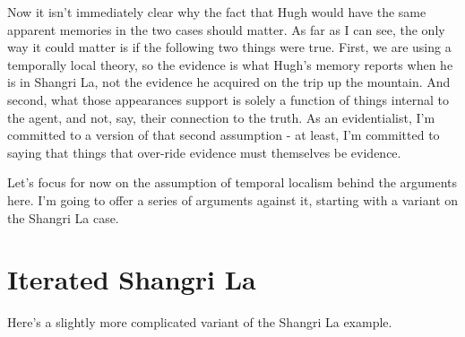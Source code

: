 \documentclass[
  11pt,
  letterpaper,
  DIV=11,
  numbers=noendperiod,
  twoside]{scrartcl}
\begin{document}
Now it isn't immediately clear why the fact that Hugh would have the
same apparent memories in the two cases should matter. As far as I can
see, the only way it could matter is if the following two things were
true. First, we are using a temporally local theory, so the evidence is
what Hugh's memory reports when he is in Shangri La, not the evidence he
acquired on the trip up the mountain. And second, what those appearances
support is solely a function of things internal to the agent, and not,
say, their connection to the truth. As an evidentialist, I'm committed
to a version of that second assumption - at least, I'm committed to
saying that things that over-ride evidence must themselves be evidence.

Let's focus for now on the assumption of temporal localism behind the
arguments here. I'm going to offer a series of arguments against it,
starting with a variant on the Shangri La case.

\section{Iterated Shangri La}\label{iteratedshangrila}

Here's a slightly more complicated variant of the Shangri La example.
\end{document}
